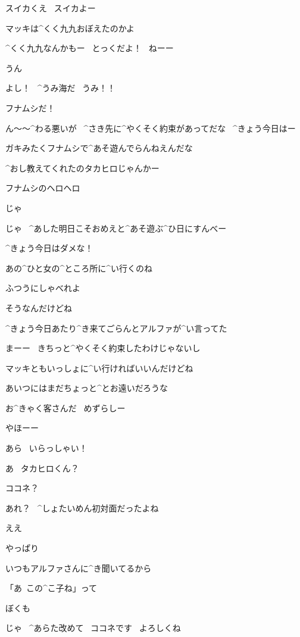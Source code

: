 \Person スイカくえ
\ スイカよー

\Takahiro マッキは^{くく}{九九}おぼえたのかよ

\Makki ^{くく}{九九}なんかもー
\ とっくだよ！
\ ねーー

\Person うん

\page[10]
\Makki よし！
\ ^{うみ}{海}だ
\ うみ！！

\Makki フナムシだ！

\Takahiro ん〜〜^{わる}{悪}いが
\ ^{さき}{先}に^{やくそく}{約束}があってだな
\ ^{きょう}{今日}はー

\Takahiro ガキみたくフナムシで^{あそ}{遊}んでらんねえんだな

\Makki ^{おし}{教}えてくれたのタカヒロじゃんかー

\Makki フナムシのヘロヘロ

\page[11]
\Takahiro じゃ

\Takahiro じゃ
\ ^{あした}{明日}こそおめえと^{あそ}{遊}ぶ^{ひ}{日}にすんべー

\Takahiro ^{きょう}{今日}はダメな！

\Makki あの^{ひと}{女}の^{ところ}{所}に^{い}{行}くのね

\Takahiro ふつうにしゃべれよ

\Takahiro そうなんだけどね

\page[12]
\Takahiro ^{きょう}{今日}あたり^{き}{来}てごらんとアルファが^{い}{言}ってた

\Takahiro まーー
\ きちっと^{やくそく}{約束}したわけじゃないし

\Takahiro マッキともいっしょに^{い}{行}ければいいんだけどね

\Takahiro あいつにはまだちょっと^{とお}{遠}いだろうな

\page[13]
\Takahiro お^{きゃく}{客}さんだ
\ めずらしー

\Takahiro やほーー

\page[14]
\Alpha あら
\ いらっしゃい！

\Kokone あ
\ タカヒロくん？

\page[15]
\Takahiro ココネ？

\Alpha あれ？
\ ^{しょたいめん}{初対面}だったよね

\Kokone ええ

\Kokone やっぱり

\Kokone いつもアルファさんに^{き}{聞}いてるから

\Kokone 「あ\ この^{こ}{子}ね」って

\Takahiro ぼくも

\page[16]
\Kokone じゃ
\ ^{あらた}{改}めて
\ ココネです
\ よろしくね

